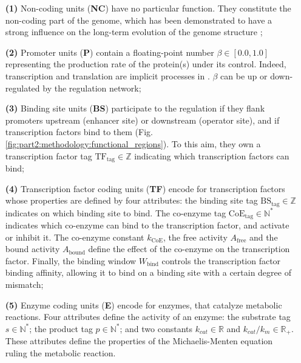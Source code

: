 \begin{enumerate}
\item[\textbf{(1)}] Non-coding units (\textbf{NC}) have no particular function. They constitute the non-coding part of the genome, which has been demonstrated to have a strong influence on the long-term evolution of the genome structure \citep{knibbe-et-al-2007a};
\item[\textbf{(2)}] Promoter units (\textbf{P}) contain a floating-point number $\beta \in [0.0, 1.0]$ representing the production rate of the protein(s) under its control. Indeed, transcription and translation are implicit processes in {\EvoEvoSim}. $\beta$ can be up or down-regulated by the regulation network;
\item[\textbf{(3)}] Binding site units (\textbf{BS}) participate to the regulation if they flank promoters upstream (enhancer site) or downstream (operator site), and if transcription factors bind to them (Fig. \ref{fig:part2:methodology:functional_regions}). To this aim, they own a transcription factor tag $\text{TF}_\text{tag} \in \mathbb{Z}$ indicating which transcription factors can bind;
\item[\textbf{(4)}] Transcription factor coding units (\textbf{TF}) encode for transcription factors whose properties are defined by four attributes: the binding site tag $\text{BS}_\text{tag} \in \mathbb{Z}$ indicates on which binding site to bind. The co-enzyme tag $\text{CoE}_\text{tag} \in \mathbb{N}^*$ indicates which co-enzyme can bind to the transcription factor, and activate or inhibit it. The co-enzyme constant $k_{\text{CoE}}$, the free activity $A_{\text{free}}$ and the bound activity $A_{\text{bound}}$ define the effect of the co-enzyme on the transcription factor. Finally, the binding window $W_\text{bind}$ controls the transcription factor binding affinity, allowing it to bind on a binding site with a certain degree of mismatch;
\item[\textbf{(5)}] Enzyme coding units (\textbf{E}) encode for enzymes, that catalyze metabolic reactions. Four attributes define the activity of an enzyme: the substrate tag $s \in \mathbb{N}^*$; the product tag $p \in \mathbb{N}^*$; and two constants $k_{cat} \in \mathbb{R}$ and $k_{cat}/k_m \in \mathbb{R}_+$. These attributes define the properties of the Michaelis-Menten equation ruling the metabolic reaction.
\end{enumerate}

